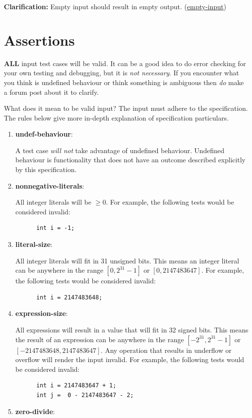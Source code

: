 \documentclass{article}
\newcommand{\assertiondest}[1]{\hypertarget{#1}{\textbf{#1}:}}
\newcommand{\clarification}[2]{\textbf{Clarification: }#1 (\hyperlink{#2}{#2})}
\begin{document}
\clarification{Empty input should result in empty output.}{empty-input}

\section{Assertions}
\textbf{ALL} input test cases will be valid. It can be a good idea to do error checking for your
own testing and debugging, but it is \textit{not necessary}. If you encounter what you think is
undefined behaviour or think something is ambiguous then \textit{do} make a forum post about it to
clarify.

What does it mean to be valid input? The input must adhere to the specification. The rules below
give more in-depth explanation of specification particulars.
\begin{enumerate}
  \item
    \assertiondest{undef-behaviour}
    A test case \textit{will not} take advantage of undefined behaviour. Undefined behaviour is
    functionality that does not have an outcome described explicitly by this specification.
  \item
    \assertiondest{nonnegative-literals}
    All integer literals will be $\geq 0$. For example, the following tests would be considered
    invalid:
    \begin{lstlisting}
      int i = -1;
    \end{lstlisting}
  \item
    \assertiondest{literal-size}
    All integer literals will fit in 31 unsigned bits. This means an integer literal can be
    anywhere in the range $[0, 2^{31} - 1]$ or $[0, 2147483647]$. For example, the following tests
    would be considered invalid:
    \begin{lstlisting}
      int i = 2147483648;
    \end{lstlisting}
  \item
    \assertiondest{expression-size}
    All expressions will result in a value that will fit in 32 signed bits. This means the result
    of an expression can be anywhere in the range $[-2^{31}, 2^{31} - 1]$ or $[-2147483648,
    2147483647]$. Any operation that results in underflow or overflow will render the input
    invalid. For example, the following tests would be considered invalid:
    \begin{lstlisting}
      int i = 2147483647 + 1;
      int j =  0 - 2147483647 - 2;
    \end{lstlisting}
  \item
    \assertiondest{zero-divide}

\end{enumerate}
\end{document}
